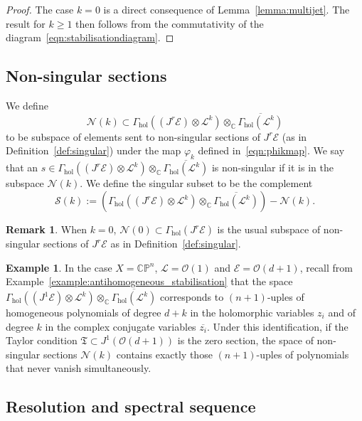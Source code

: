 \documentclass[a4paper]{amsart}
\newcommand{\bC}{\mathbb C}
\newcommand{\bP}{\mathbb P}
\newcommand{\cE}{\mathcal E}
\newcommand{\cS}{\mathcal S}
\newcommand{\cN}{\mathcal N}
\newcommand{\cL}{\mathcal L}
\newcommand{\cO}{\mathcal O}
\newcommand{\fT}{\mathfrak T}
\theoremstyle{plain}
\theoremstyle{definition}
\newtheorem{example}[theorem]{Example}
\newtheorem{remark}[theorem]{Remark}
\newcommand{\Gammahol}{\Gamma_{\mathrm{hol}}}
\begin{document}
\begin{proof}
The case $k=0$ is a direct consequence of Lemma~\ref{lemma:multijet}. The result for $k \geq 1$ then follows from the commutativity of the diagram~\eqref{eqn:stabilisationdiagram}.
\end{proof}


\subsection{Non-singular sections}

We define
\[
    \cN(k) \subset \Gammahol\left( (J^r\cE) \otimes \cL^k \right) \otimes_\bC \overline{\Gammahol\left(\cL^k \right)} 
\]
to be subspace of elements sent to non-singular sections of $J^r\cE$ (as in Definition~\ref{def:singular}) under the map $\varphi_k$ defined in~\eqref{eqn:phikmap}. We say that an $s \in \Gammahol\left( (J^r\cE) \otimes \cL^k \right) \otimes_\bC \overline{\Gammahol\left(\cL^k \right)}$ is non-singular if it is in the subspace $\cN(k)$. We define the singular subset to be the complement
\[
    \cS(k) := \left(\Gammahol\left( (J^r\cE) \otimes \cL^k \right) \otimes_\bC \overline{\Gammahol\left(\cL^k \right)}\right) - \cN(k).
\]

\begin{remark}
When $k = 0$, $\cN(0) \subset \Gammahol(J^r\cE)$ is the usual subspace of non-singular sections of $J^r\cE$ as in Definition~\ref{def:singular}.
\end{remark}

\begin{example}\label{example:antihomogeneous}
In the case $X = \bC\bP^n$, $\cL = \cO(1)$ and $\cE = \cO(d+1)$, recall from Example~\ref{example:antihomogeneous_stabilisation} that the space $\Gammahol\left( (J^1\cE) \otimes \cL^k \right) \otimes_\bC \overline{\Gammahol\left(\cL^k \right)}$ corresponds to $(n+1)$-uples of homogeneous polynomials of degree $d+k$ in the holomorphic variables $z_i$ and of degree $k$ in the complex conjugate variables $\overline{z_i}$. Under this identification, if the Taylor condition $\fT \subset J^1(\cO(d+1))$ is the zero section, the space of non-singular sections $\cN(k)$ contains exactly those $(n+1)$-uples of polynomials that never vanish simultaneously.
\end{example}

\subsection{Resolution and spectral sequence}\label{subsection:adaptationSS}
\end{document}
